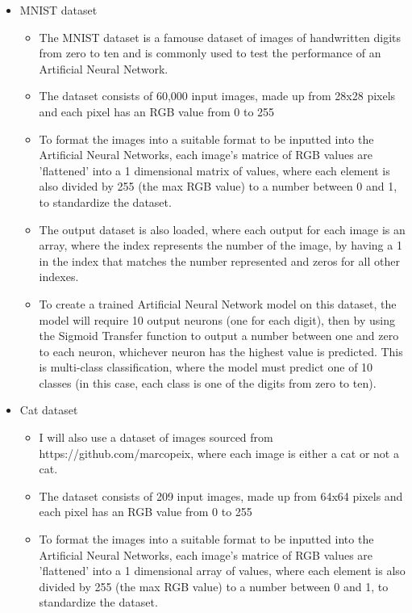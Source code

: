\documentclass[./project-report/src/latex/project-report.tex]{subfiles}
\begin{document}
\begin{itemize}
    \item MNIST dataset
    \begin{itemize}
        \item The MNIST dataset is a famouse dataset of images of handwritten digits from zero to ten and is commonly used to test the performance of an Artificial 
              Neural Network.
        \item The dataset consists of 60,000 input images, made up from 28x28 pixels and each pixel has an RGB value from 0 to 255
        \item To format the images into a suitable format to be inputted into the Artificial Neural Networks, each image's matrice of RGB values are 'flattened' into a 
              1 dimensional matrix of values, where each element is also divided by 255 (the max RGB value) to a number between 0 and 1, to standardize the dataset.
        \item The output dataset is also loaded, where each output for each image is an array, where the index represents the number of the image, by having a 1 in the 
              index that matches the number represented and zeros for all other indexes.
        \item To create a trained Artificial Neural Network model on this dataset, the model will require 10 output neurons (one for each digit), then by using the 
              Sigmoid Transfer function to output a number between one and zero to each neuron, whichever neuron has the highest value is predicted. This is multi-class 
              classification, where the model must predict one of 10 classes (in this case, each class is one of the digits from zero to ten).
    \end{itemize}
    \item Cat dataset
    \begin{itemize}
        \item I will also use a dataset of images sourced from https://github.com/marcopeix, where each image is either a cat or not a cat.
        \item The dataset consists of 209 input images, made up from 64x64 pixels and each pixel has an RGB value from 0 to 255
        \item To format the images into a suitable format to be inputted into the Artificial Neural Networks, each image's matrice of RGB values are 'flattened' into a 
              1 dimensional array of values, where each element is also divided by 255 (the max RGB value) to a number between 0 and 1, to standardize the dataset.

\end{itemize}
\end{itemize}
\end{document}
